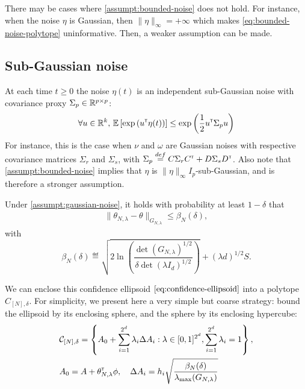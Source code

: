 \documentclass{article}
\begin{document}
There may be cases where \autoref{assumpt:bounded-noise} does not hold. For instance, when the noise $\eta$ is Gaussian, then $\|\eta\|_\infty=+\infty$ which makes \eqref{eq:bounded-noise-polytope} uninformative. Then, a weaker assumption can be made.

\subsection{Sub-Gaussian noise}

\begin{assumption}
\label{assumpt:gaussian-noise}
At each time $t\geq0$ the noise $\eta(t)$ is an independent sub-Gaussian noise with covariance proxy $\Sigma_p \in \mathbb{R}^{p\times p}$:
\begin{equation*}
    \forall u\in\mathbb{R}^k,\, \operatorname*{\mathbb{E}} \left[ \exp{\left( u^{\mathsf{\scriptscriptstyle T}}\eta(t)\right)}\right] \leq \exp{\left( \frac{1}{2} u^{\mathsf{\scriptscriptstyle T}}\Sigma_p u\right)}
\end{equation*}
For instance, this is the case when $\nu$ and $\omega$ are Gaussian noises with respective covariance matrices $\Sigma_r$ and $\Sigma_s$, with $\Sigma_p \stackrel{def}{=} C\Sigma_r C^{\mathsf{\scriptscriptstyle T}} + D\Sigma_s D^{\mathsf{\scriptscriptstyle T}}$. Also note that \autoref{assumpt:bounded-noise} implies that $\eta$ is $\|\eta\|_\infty I_p$-sub-Gaussian, and is therefore a stronger assumption.
\end{assumption}

\begin{theorem}
\label{thm:confidence_ellipsoid}
Under \autoref{assumpt:gaussian-noise}, it holds with probability at least $1-\delta$ that
\begin{align}
    \label{eq:confidence-ellipsoid}
    \| \theta_{N,\lambda}  - \theta\|_{G_{N,\lambda}} \leq \beta_N(\delta),
\end{align}
with
\begin{equation}
	\label{eq:beta_n}
    \beta_N(\delta)\eqdef \sqrt{2\ln \left(\frac{\det(G_{N,\lambda})^{1/2}}{\delta\det(\lambda I_d)^{1/2}}\right)}
     + (\lambda d)^{1/2}S.
\end{equation}
\end{theorem}

We can enclose this confidence ellipsoid $\eqref{eq:confidence-ellipsoid}$ into a polytope $C_{[N],\delta}$. For simplicity, we present here a very simple but coarse strategy: bound the ellipsoid by its enclosing sphere, and the sphere by its enclosing hypercube:
\begin{align}
    \label{eq:polytope}
     &\mathcal{C}_{[N],\delta} = \left\{ A_{0}+\sum_{i=1}^{2^d}\lambda_{i}\Delta A_{i}: \lambda\in[0, 1]^{2^d},  \sum_{i=1}^{2^d}\lambda_{i}=1\right\},\\
     &A_0 = A + \theta_{N,\lambda}^{\mathsf{\scriptscriptstyle T}}\phi, \quad\Delta A_{i} = h_i \sqrt{\frac{\beta_N(\delta)}{\lambda_{\max}(G_{N,\lambda})}}
\end{align}
\end{document}
